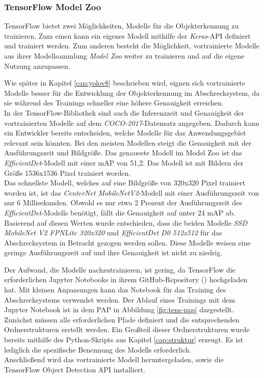\subsubsection{TensorFlow Model Zoo} \label{cap:tensorflow}

TensorFlow bietet zwei Möglichkeiten, Modelle für die Objekterkennung zu trainieren. Zum einen kann ein eigenes Modell mithilfe der \textit{Keras}-API definiert und trainiert werden. Zum anderen besteht die Möglichkeit, vortrainierte Modelle aus ihrer Modellsammlung \textit{Model Zoo} weiter zu trainieren und auf die eigene Nutzung anzupassen. 

Wie später in Kapitel \ref{cap:yolov8} beschrieben wird, eignen sich vortrainierte Modelle besser für die Entwicklung der Objekterkennung im Abschrecksystem, da sie während des Trainings schneller eine höhere Genauigkeit erreichen.
\\
In der TensorFlow-Bibliothek sind auch die Inferenzzeit und Genauigkeit der vortrainierten Modelle auf dem \textit{COCO-2017}-Datensatz angegeben. Dadurch kann ein Entwickler bereits entscheiden, welche Modelle für das Anwendungsgebiet relevant sein könnten. Bei den meisten Modellen steigt die Genauigkeit mit der Ausführungszeit und Bildgröße.  Das genaueste Modell im Model Zoo ist das \textit{EfficientDet}-Modell mit einer \ac{mAP} von 51,2. Das Modell ist mit Bildern der Größe 1536x1536 Pixel trainiert worden.
\\
Das schnellste Modell, welches auf eine Bildgröße von 320x320 Pixel trainiert worden ist, ist das \textit{CenterNet MobileNetV2}-Modell mit einer Ausführungszeit von nur 6 Millisekunden. Obwohl es nur etwa 2 Prozent der Ausführungszeit des \textit{EfficientDet}-Modells benötigt, fällt die Genauigkeit auf unter 24 \ac{mAP} ab.
\\
Basierend auf diesen Werten wurde entschieden, dass die beiden Modelle \textit{SSD MobileNet V2 FPNLite 320x320} und \textit{EfficientDet D0 512x512} für das Abschrecksystem in Betracht gezogen werden sollen. Diese Modelle weisen eine geringe Ausführungszeit auf und ihre Genauigkeit ist nicht zu niedrig. \cite{tens_zoo}


Der Aufwand, die Modelle nachzutrainieren, ist gering, da TensorFlow die erforderlichen Jupyter Notebooks in ihrem GitHub-Repository (\cite{tens_zoo}) hochgeladen hat. Mit kleinen Anpassungen kann das Notebook für das Training des Abschrecksystems verwendet werden. Der Ablauf eines Trainings mit dem Jupyter Notebook ist in dem \ac{PAP} in Abbildung \ref{fig:tens-pap} dargestellt.
\\
Zunächst müssen alle erforderlichen Pfade definiert und die entsprechenden Ordnerstrukturen erstellt werden. Ein Großteil dieser Ordnerstrukturen wurde bereits mithilfe des Python-Skripts aus Kapitel \ref{cap:struktur} erzeugt. Es ist lediglich die spezifische Benennung des Modells erforderlich.
\\
Anschließend wird das vortrainierte Modell heruntergeladen, sowie die TensorFlow Object Detection API installiert.


